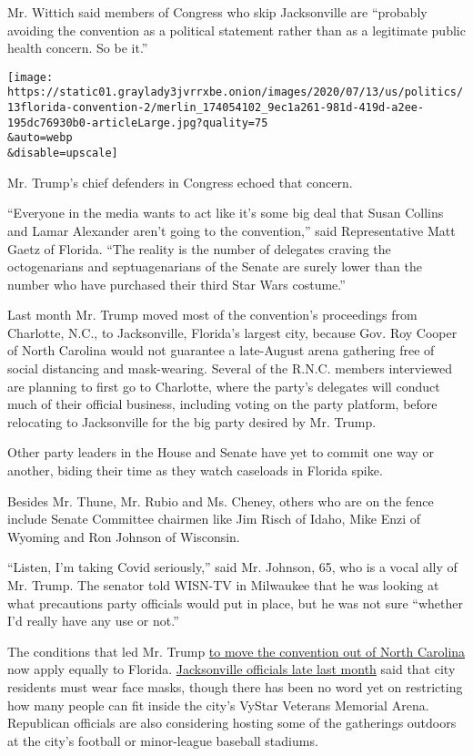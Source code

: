 Mr. Wittich said members of Congress who skip Jacksonville are
``probably avoiding the convention as a political statement rather than
as a legitimate public health concern. So be it.''

\texttt{[image: https://static01.graylady3jvrrxbe.onion/images/2020/07/13/us/politics/13florida-convention-2/merlin\_174054102\_9ec1a261-981d-419d-a2ee-195dc76930b0-articleLarge.jpg?quality=75\\\&auto=webp\\\&disable=upscale]}

Mr. Trump's chief defenders in Congress echoed that concern.

``Everyone in the media wants to act like it's some big deal that Susan
Collins and Lamar Alexander aren't going to the convention,'' said
Representative Matt Gaetz of Florida. ``The reality is the number of
delegates craving the octogenarians and septuagenarians of the Senate
are surely lower than the number who have purchased their third Star
Wars costume.''

Last month Mr. Trump moved most of the convention's proceedings from
Charlotte, N.C., to Jacksonville, Florida's largest city, because Gov.
Roy Cooper of North Carolina would not guarantee a late-August arena
gathering free of social distancing and mask-wearing. Several of the
R.N.C. members interviewed are planning to first go to Charlotte, where
the party's delegates will conduct much of their official business,
including voting on the party platform, before relocating to
Jacksonville for the big party desired by Mr. Trump.

Other party leaders in the House and Senate have yet to commit one way
or another, biding their time as they watch caseloads in Florida spike.

Besides Mr. Thune, Mr. Rubio and Ms. Cheney, others who are on the fence
include Senate Committee chairmen like Jim Risch of Idaho, Mike Enzi of
Wyoming and Ron Johnson of Wisconsin.

``Listen, I'm taking Covid seriously,'' said Mr. Johnson, 65, who is a
vocal ally of Mr. Trump. The senator told WISN-TV in Milwaukee that he
was looking at what precautions party officials would put in place, but
he was not sure ``whether I'd really have any use or not.''

The conditions that led Mr. Trump
\href{https://www.nytimes3xbfgragh.onion/2020/06/11/us/politics/trump-jacksonville-rnc-speech.html}{to
move the convention out of North Carolina} now apply equally to Florida.
\href{https://www.nytimes3xbfgragh.onion/2020/06/29/us/politics/rnc-masks-convention.html}{Jacksonville
officials late last month} said that city residents must wear face
masks, though there has been no word yet on restricting how many people
can fit inside the city's VyStar Veterans Memorial Arena. Republican
officials are also considering hosting some of the gatherings outdoors
at the city's football or minor-league baseball stadiums.

